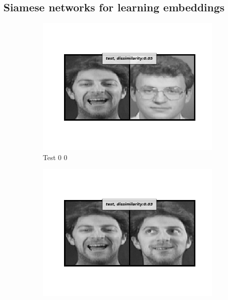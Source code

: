 \documentclass[12pt]{article}
\begin{document}
\newpage
\subsection{Siamese networks for learning embeddings}
\begin{figure}[htbp]
    \centering
    \begin{subfigure}[t]{0.48\textwidth}
        \centering
        \includegraphics[scale=0.5,trim={1in 1in 1in 1in},clip]{./Homework3/output/siamese/test_0_0.png}
        \caption{Test 0 0}
    \label{hw3p3a}
    \end{subfigure}
    \begin{subfigure}[t]{0.48\textwidth}
        \centering
        \includegraphics[scale=0.5,trim={1in 1in 1in 1in},clip]{./Homework3/output/siamese/test_0_1.png}

\end{subfigure}
\end{figure}
\end{document}
